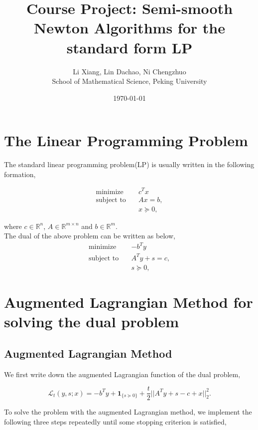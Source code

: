 \documentclass[a4paper]{article}
\title{Course Project: Semi-smooth Newton Algorithms for the standard form LP}
\author{Li Xiang, Lin Dachao, Ni Chengzhuo \\ School of Mathematical Science, Peking University}
\date{\today}
\begin{document}
\maketitle

\section{The Linear Programming Problem}
The standard linear programming problem(LP) is usually written in the following formation, 

\begin{equation}\label{primal}
\begin{split}
\textrm{minimize} \quad  & c^Tx\\
\textrm{subject to} \quad & Ax=b, \\
& x \succeq 0,
\end{split}
\end{equation}

where $c\in \mathbb{R}^n$, $A\in\mathbb{R}^{m \times n}$ and $b \in \mathbb{R}^m$. \\

The dual of the above problem can be written as below,
\begin{equation}\label{dual}
\begin{split}
\textrm{minimize} \quad  & -b^Ty\\
\textrm{subject to} \quad & A^Ty+s=c, \\
& s \succeq 0,
\end{split}
\end{equation}

\section{Augmented Lagrangian Method for solving the dual problem}
\subsection{Augmented Lagrangian Method}

We first write down the augmented Lagrangian function of the dual problem, 

\begin{equation}\label{AL}
\mathcal{L}_{t}(y,s;x) = -b^Ty + \mathbf{1}_{\{s\succeq0\}}+ \frac{t}{2}||A^Ty+s-c+x||^2_2.
\end{equation}

To solve the problem with the augmented Lagrangian method, we implement the following three steps repeatedly until some stopping criterion is satisfied, 
\end{document}
